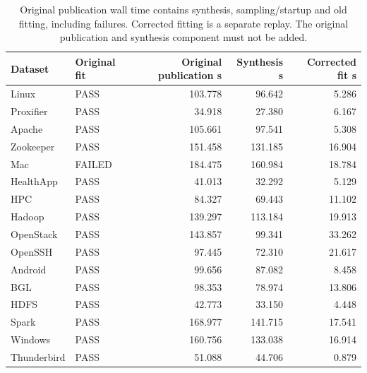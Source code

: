 \begin{longtable}{llrrr}
\caption{Original publication wall time contains synthesis, sampling/startup and old fitting, including failures. Corrected fitting is a separate replay. The original publication and synthesis component must not be added.}\\
\toprule
Dataset & Original fit & Original publication s & Synthesis s & Corrected fit s \\ \midrule\endhead
Linux & PASS & 103.778 & 96.642 & 5.286 \\
Proxifier & PASS & 34.918 & 27.380 & 6.167 \\
Apache & PASS & 105.661 & 97.541 & 5.308 \\
Zookeeper & PASS & 151.458 & 131.185 & 16.904 \\
Mac & FAILED & 184.475 & 160.984 & 18.784 \\
HealthApp & PASS & 41.013 & 32.292 & 5.129 \\
HPC & PASS & 84.327 & 69.443 & 11.102 \\
Hadoop & PASS & 139.297 & 113.184 & 19.913 \\
OpenStack & PASS & 143.857 & 99.341 & 33.262 \\
OpenSSH & PASS & 97.445 & 72.310 & 21.617 \\
Android & PASS & 99.656 & 87.082 & 8.458 \\
BGL & PASS & 98.353 & 78.974 & 13.806 \\
HDFS & PASS & 42.773 & 33.150 & 4.448 \\
Spark & PASS & 168.977 & 141.715 & 17.541 \\
Windows & PASS & 160.756 & 133.038 & 16.914 \\
Thunderbird & PASS & 51.088 & 44.706 & 0.879 \\
\bottomrule\end{longtable}
